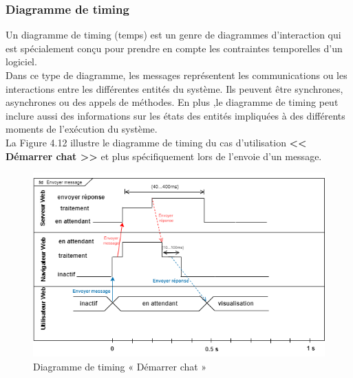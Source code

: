 \subsubsection{Diagramme de timing}
Un diagramme de timing (temps) est un genre de diagrammes d'interaction qui est spécialement conçu pour prendre en compte les contraintes temporelles d'un logiciel.\\
Dans ce type de diagramme, les messages représentent les communications ou les interactions entre les différentes entités du système. Ils peuvent être synchrones, asynchrones ou des appels de méthodes. En plus ,le diagramme de timing peut inclure aussi des informations sur les états des entités impliquées à des différents moments de l’exécution du système.\\
La Figure 4.12 illustre le diagramme de timing du cas d’utilisation \textbf{<< Démarrer chat >>} et plus spécifiquement lors de l’envoie d’un message.

\begin{figure}[H]
    \centering
    \includegraphics[width=\textwidth]{images/chp4/fig12.png}
    \caption{Diagramme de timing « Démarrer chat »}
    \label{fig:Diagramme de timing « Démarrer chat »}    
\end{figure}

